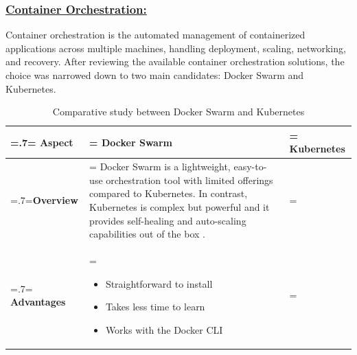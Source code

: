 \subsubsection*{\underline{Container Orchestration:}}
Container orchestration is the automated management of containerized applications 
across multiple machines, handling deployment, scaling, networking, and recovery. 
After reviewing the available container orchestration solutions, the choice 
was narrowed down to two main candidates: Docker Swarm and Kubernetes.

\begin{table}[H]
    \renewcommand{\arraystretch}{1.5}%
    \caption{Comparative study between Docker Swarm and Kubernetes}
    \centering
    \medskip
    \begin{tabularx}{1\textwidth} {
            | >{\hsize=.7\hsize\linewidth=\hsize\centering\arraybackslash}X
            | >{\hsize=1.15\hsize\linewidth=\hsize\justifying\arraybackslash}X
            | >{\hsize=1.15\hsize\linewidth=\hsize\justifying\arraybackslash}X |}
        \hline
        \rowcolor{primary} \textbf {Aspect} & \textbf{Docker Swarm}                                                                                                                                                                                                                                                              & \textbf{Kubernetes}                                                      \\
        \hline
        \textbf {Overview}                  & \multicolumn{2}{|>{\hsize=2.35\hsize}X|} {Docker Swarm is a lightweight, easy-to-use orchestration tool with limited offerings compared to Kubernetes. In contrast, Kubernetes is complex but powerful and it provides self-healing and auto-scaling capabilities out of the box \cite{comparative_orchestration_2024}.}                                                                            \\
        \hline
        \textbf {Advantages}                & \begin{itemize}[leftmargin=*, topsep=0pt, itemsep=1pt, parsep=2pt]
            \item Straightforward to install
            \item Takes less time to learn
            \item Works with the Docker CLI
        \end{itemize}                                                                                                                                                                                                                                                          & \begin{itemize}[leftmargin=*, topsep=0pt, itemsep=1pt, parsep=2pt]

\end{itemize}
\end{tabularx}
\end{table}
